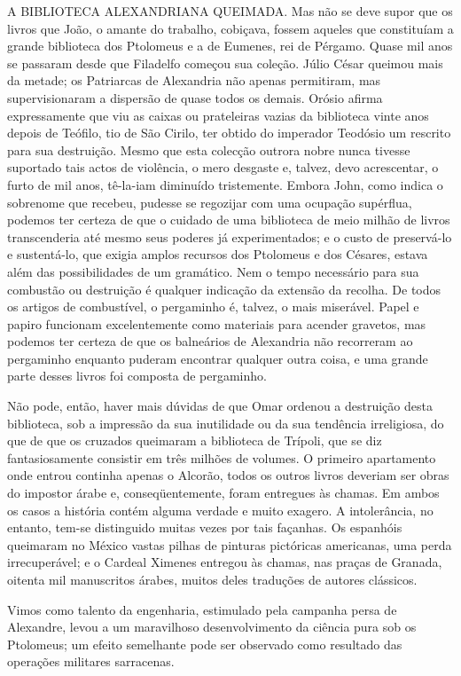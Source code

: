 \documentclass[11pt,a5paper,twoside,openany]{book}
\begin{document}
A BIBLIOTECA ALEXANDRIANA QUEIMADA. Mas não se deve supor que os livros que João, o amante do trabalho, cobiçava, fossem aqueles que constituíam a grande biblioteca dos Ptolomeus e a de Eumenes, rei de Pérgamo. Quase mil anos se passaram desde que Filadelfo começou sua coleção. Júlio César queimou mais da metade; os Patriarcas de Alexandria não apenas permitiram, mas supervisionaram a dispersão de quase todos os demais. Orósio afirma expressamente que viu as caixas ou prateleiras vazias da biblioteca vinte anos depois de Teófilo, tio de São Cirilo, ter obtido do imperador Teodósio um rescrito para sua destruição. Mesmo que esta colecção outrora nobre nunca tivesse suportado tais actos de violência, o mero desgaste e, talvez, devo acrescentar, o furto de mil anos, tê-la-iam diminuído tristemente. Embora John, como indica o sobrenome que recebeu, pudesse se regozijar com uma ocupação supérflua, podemos ter certeza de que o cuidado de uma biblioteca de meio milhão de livros transcenderia até mesmo seus poderes já experimentados; e o custo de preservá-lo e sustentá-lo, que exigia amplos recursos dos Ptolomeus e dos Césares, estava além das possibilidades de um gramático. Nem o tempo necessário para sua combustão ou destruição é qualquer indicação da extensão da recolha. De todos os artigos de combustível, o pergaminho é, talvez, o mais miserável. Papel e papiro funcionam excelentemente como materiais para acender gravetos, mas podemos ter certeza de que os balneários de Alexandria não recorreram ao pergaminho enquanto puderam encontrar qualquer outra coisa, e uma grande parte desses livros foi composta de pergaminho.

Não pode, então, haver mais dúvidas de que Omar ordenou a destruição desta biblioteca, sob a impressão da sua inutilidade ou da sua tendência irreligiosa, do que de que os cruzados queimaram a biblioteca de Trípoli, que se diz fantasiosamente consistir em três milhões de volumes. O primeiro apartamento onde entrou continha apenas o Alcorão, todos os outros livros deveriam ser obras do impostor árabe e, conseqüentemente, foram entregues às chamas. Em ambos os casos a história contém alguma verdade e muito exagero. A intolerância, no entanto, tem-se distinguido muitas vezes por tais façanhas. Os espanhóis queimaram no México vastas pilhas de pinturas pictóricas americanas, uma perda irrecuperável; e o Cardeal Ximenes entregou às chamas, nas praças de Granada, oitenta mil manuscritos árabes, muitos deles traduções de autores clássicos.

Vimos como talento da engenharia, estimulado pela campanha persa de Alexandre, levou a um maravilhoso desenvolvimento da ciência pura sob os Ptolomeus; um efeito semelhante pode ser observado como resultado das operações militares sarracenas.
\end{document}
